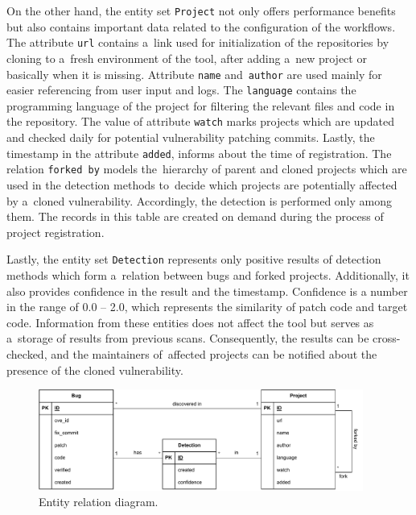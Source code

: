     On the other hand, the entity set \texttt{Project} not only offers performance benefits but also contains important
    data related to the configuration of the workflows. The attribute \texttt{url} contains a~link used for initialization
    of the repositories by cloning to a~fresh environment of the tool, after adding a~new project or basically
    when it is missing. Attribute \texttt{name} and~\texttt{author} are used mainly for easier referencing from user input
    and logs. The \texttt{language} contains the programming language of the project for filtering the relevant
    files and code in the repository. The value of attribute \texttt{watch} marks projects which are updated and checked
    daily for potential vulnerability patching commits. Lastly, the timestamp in the attribute \texttt{added}, informs
    about the time of registration. The relation \texttt{forked by} models the~hierarchy of parent and cloned projects
    which are used in the detection methods to~decide which projects are potentially affected by a~cloned vulnerability.
    Accordingly, the detection is performed only among them. The records in this table are created on demand during
    the process of project registration.

    Lastly, the entity set \texttt{Detection} represents only positive results of detection methods which form a~relation
    between bugs and forked projects. Additionally, it also provides confidence in the result and the timestamp.
    Confidence is a number in the range of 0.0 -- 2.0, which represents the similarity of patch code and target code.
    Information from these entities does not affect the tool but serves as a~storage of results from previous scans.
    Consequently, the results can be cross-checked, and the maintainers of~affected projects can be notified about the presence
    of the cloned vulnerability.

    \begin{figure}[h]
      \centering
      \includegraphics[width=0.95\textwidth]{obrazky-figures/cloneguard_erd.drawio.pdf}
      \caption{Entity relation diagram.}
      \label{erd}
    \end{figure}
    \bigskip

